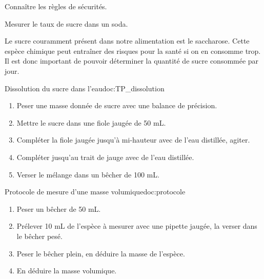 \teteSndCorp



\begin{objectifs}
  \item Connaître les règles de sécurités.
  \item Mesurer le taux de sucre dans un soda.
\end{objectifs}

\begin{encart}
  
  Le sucre couramment présent dans notre alimentation est le saccharose.
  Cette espèce chimique peut entraîner des risques pour la santé si on en consomme trop.
  Il est donc important de pouvoir déterminer la quantité de sucre consommée par jour.
\end{encart}



\begin{doc}{Dissolution du sucre dans l'eau}{doc:TP_dissolution}
  \begin{enumerate}
      \item Peser une masse donnée de sucre avec une balance de précision.
      \item Mettre le sucre dans une fiole jaugée de 50 mL.
      \item Compléter la fiole jaugée jusqu'à mi-hauteur avec de l'eau distillée, agiter.
      \item Compléter jusqu'au trait de jauge avec de l'eau distillée.
      \item Verser le mélange dans un bêcher de 100 mL.
  \end{enumerate}
\end{doc}

\begin{doc}{Protocole de mesure d'une masse volumique}{doc:protocole}
  \begin{enumerate}
    \item Peser un bêcher de 50 mL.
    \item Prélever 10 mL de l'espèce à mesurer avec une pipette jaugée, la verser dans le bêcher pesé.
    \item Peser le bêcher plein, en déduire la masse de l'espèce.
    \item En déduire la masse volumique.
  \end{enumerate}
\end{doc}


